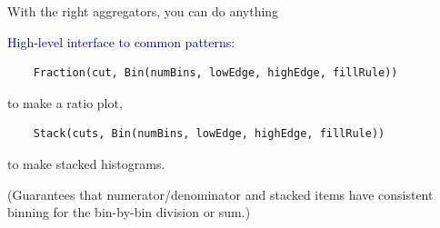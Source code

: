\documentclass[aspectratio=169]{beamer}
\begin{document}
\begin{frame}[fragile]{With the right aggregators, you can do anything}
\begin{center}
\begin{minipage}{0.9\linewidth}
\small
\textcolor{darkblue}{\normalsize High-level interface to common patterns:}
\begin{verbatim}
    Fraction(cut, Bin(numBins, lowEdge, highEdge, fillRule))
\end{verbatim}

{\normalsize to make a ratio plot,}

\begin{verbatim}
    Stack(cuts, Bin(numBins, lowEdge, highEdge, fillRule))
\end{verbatim}

{\normalsize to make stacked histograms.}

\vspace{0.25 cm}
{\normalsize (Guarantees that numerator/denominator and stacked items have consistent binning for the bin-by-bin division or sum.)}
\end{minipage}
\end{center}
\end{frame}
\end{document}
